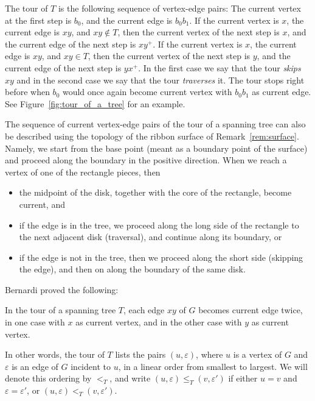 \documentclass[ALCO,ThmDefs,Unicode,epreuves]{cedram}
\begin{document}
The tour of $T$ is the following sequence of vertex-edge pairs: The current vertex at the first step is $b_0$, and the current edge is $b_0b_1$. If the current vertex is $x$, the current edge is $xy$, and $xy\notin T$, then the current vertex of the next step is $x$, and the current edge of the next step is $xy^+$. If the current vertex is $x$, the current edge is $xy$, and $xy\in T$, then the current vertex of the next step is $y$, and the current edge of the next step is $yx^+$. In the first case we say that the tour \emph{skips} $xy$ and in the second case we say that the tour \emph{traverses} it. The tour stops right before when $b_0$ would once again become current vertex with $b_0b_1$ as current edge. See Figure~\ref{fig:tour_of_a_tree} for an example.

\begin{rema}
	\label{rem:topological_interpretation_of_tour_of_a_tree}
	The sequence of current vertex-edge pairs of the tour of a spanning tree can also be described using the topology of the ribbon surface of Remark~\ref{rem:surface}. Namely, we start from the base point (meant as a boundary point of the surface) and proceed along the boundary in the positive direction. When we reach a vertex of one of the rectangle pieces, then
	\begin{itemize}
		\item the midpoint of the disk, together with the core of the rectangle, become current, and
		\item if the edge is in the tree, we proceed along the long side of the rectangle to the next adjacent disk (traversal), and continue along its boundary, or
		\item if the edge is not in the tree, then we proceed along the short side (skipping the edge), and then on along the boundary of the same disk. 
	\end{itemize}
\end{rema}

Bernardi proved the following:

\begin{lemma}
\label{l:T-tour_cyclic_perm}
In the tour of a spanning tree $T$, each edge $xy$ of $G$ becomes current edge twice, in one case with $x$ as current vertex, and in the other case with $y$ as current vertex.
\end{lemma}
 
In other words, the tour of $T$ lists the pairs $(u,\varepsilon)$, where $u$ is a vertex of $G$ and $\varepsilon$ is an edge of $G$ incident to $u$, in a linear order from smallest to largest. We will denote this ordering by $<_T$, and write $(u,\varepsilon)\leq_T (v,\varepsilon')$ if either $u=v$ and $\varepsilon=\varepsilon'$, or $(u,\varepsilon)<_T (v,\varepsilon')$.
\end{document}
